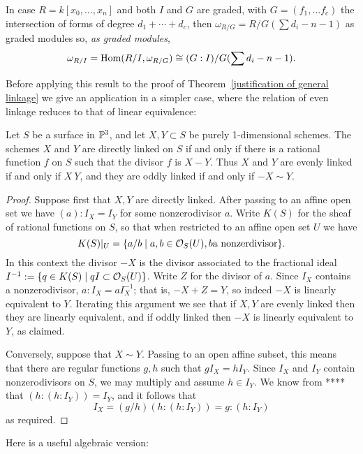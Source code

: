 In case $R = k[x_{0},\dots,x_{n}]$ and both $I$ and $G$ are graded, with $G = (f_{1}, \dots f_{c})$ the intersection of forms of degree
$d_{1}+\cdots + d_{c}$, then $\omega_{R/G} = R/G(\sum d_{i} -n-1)$ as graded modules so, \emph{as graded modules},
$$
\omega_{R/I} = \operatorname{Hom}(R/I, \omega_{R/G})\cong (G:I)/G(\sum d_{i} -n-1).
$$

Before applying this result to the proof of Theorem~\ref{justification of general linkage} we give an application in a simpler case, where
the relation of even linkage reduces to
that of linear equivalence:



\begin{proposition}
Let $S$ be a surface in ${\mathbb P}^3$, and let $X,Y\subset S$ be purely 1-dimensional schemes. The schemes $X$ and $Y$ are directly linked on $S$ if and only if
there is a rational function $f$ on $S$ such that the divisor $f$ is $X-Y$. Thus $X$ and $Y$ are evenly linked if and only if 
$X~Y$, and they are oddly linked if and only if $-X\sim Y$.
\end{proposition}

\begin{proof} Suppose first that $X,Y$ are directly linked. After passing to an affine open set we have
$(a):I_X = I_Y$ for some nonzerodivisor $a$. Write $K(S)$ for the sheaf of rational functions on $S$, so that
when restricted to an affine open set $U$ we have 
$$
K(S)|_U = \{a/b\mid a,b \in {\mathcal O}_S(U), b \hbox{a nonzerdivisor}\}.
$$  
In this context the divisor $-X$ is the divisor associated to the
fractional ideal $I^{-1} := \{q\in K(S) \mid qI \subset {\mathcal O}_S(U)\}$.
Write $Z$ for the divisor of $a$. Since $I_X$ contains a nonzerodivisor, $a:I_X = aI_X^{-1}$; that is,
$-X+Z = Y$, so indeed $-X$ is linearly equivalent to $Y$. Iterating this argument we see that if $X,Y$ are evenly linked then
they are linearly equivalent, and if oddly linked then $-X$ is linearly equivalent to $Y$, as claimed.

Conversely, suppose that $X \sim Y$. Passing to an open affine subset, this means that there are regular functions $g,h$
such that $gI_X = hI_Y$. Since $I_X$ and $I_Y$ contain nonzerodivisors on $S$, we may multiply and assume $h\in I_Y$.
We know from **** that $(h:(h:I_Y)) = I_Y$, and it follows that 
$$
I_X = (g/h)(h:(h:I_Y))= g:(h:I_Y)
$$
as required.
\end{proof}

Here is a useful algebraic version:

